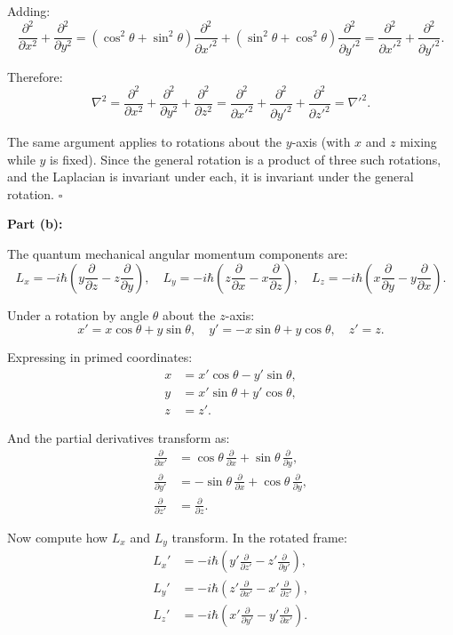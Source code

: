 \documentclass[12pt]{article}
\begin{document}
Adding:
\[
\frac{\partial^2}{\partial x^2} + \frac{\partial^2}{\partial y^2} = (\cos^2\theta + \sin^2\theta)\frac{\partial^2}{\partial x'^2} + (\sin^2\theta + \cos^2\theta)\frac{\partial^2}{\partial y'^2} = \frac{\partial^2}{\partial x'^2} + \frac{\partial^2}{\partial y'^2}.
\]

Therefore:
\[
\nabla^2 = \frac{\partial^2}{\partial x^2} + \frac{\partial^2}{\partial y^2} + \frac{\partial^2}{\partial z^2} = \frac{\partial^2}{\partial x'^2} + \frac{\partial^2}{\partial y'^2} + \frac{\partial^2}{\partial z'^2} = \nabla'^2.
\]

The same argument applies to rotations about the $y$-axis (with $x$ and $z$ mixing while $y$ is fixed). Since the general rotation is a product of three such rotations, and the Laplacian is invariant under each, it is invariant under the general rotation. $\square$

\bigskip
\noindent\textbf{Part (b):}

The quantum mechanical angular momentum components are:
\[
L_x = -i\hbar\!\left(y\frac{\partial}{\partial z} - z\frac{\partial}{\partial y}\right), \quad
L_y = -i\hbar\!\left(z\frac{\partial}{\partial x} - x\frac{\partial}{\partial z}\right), \quad
L_z = -i\hbar\!\left(x\frac{\partial}{\partial y} - y\frac{\partial}{\partial x}\right).
\]

Under a rotation by angle $\theta$ about the $z$-axis:
\[
x' = x\cos\theta + y\sin\theta, \quad y' = -x\sin\theta + y\cos\theta, \quad z' = z.
\]

Expressing in primed coordinates:
\begin{align*}
x &= x'\cos\theta - y'\sin\theta, \\
y &= x'\sin\theta + y'\cos\theta, \\
z &= z'.
\end{align*}

And the partial derivatives transform as:
\begin{align*}
\frac{\partial}{\partial x'} &= \cos\theta\,\frac{\partial}{\partial x} + \sin\theta\,\frac{\partial}{\partial y}, \\
\frac{\partial}{\partial y'} &= -\sin\theta\,\frac{\partial}{\partial x} + \cos\theta\,\frac{\partial}{\partial y}, \\
\frac{\partial}{\partial z'} &= \frac{\partial}{\partial z}.
\end{align*}

Now compute how $L_x$ and $L_y$ transform. In the rotated frame:
\begin{align*}
L_x' &= -i\hbar\!\left(y'\frac{\partial}{\partial z'} - z'\frac{\partial}{\partial y'}\right), \\
L_y' &= -i\hbar\!\left(z'\frac{\partial}{\partial x'} - x'\frac{\partial}{\partial z'}\right), \\
L_z' &= -i\hbar\!\left(x'\frac{\partial}{\partial y'} - y'\frac{\partial}{\partial x'}\right).
\end{align*}
\end{document}

